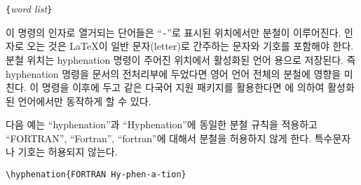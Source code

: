 \begin{lscommand}
\verb|{|\emph{word list}\verb|}|
\end{lscommand}
\noindent 이 명령의 인자로 열거되는 단어들은 ``\verb|-|''로 표시된 위치에서만 분철이 이루어진다.
인자로 오는 것은 \LaTeX 이 일반 문자(letter)로 간주하는 문자와 기호를 포함해야 한다. 
분철 위치는 hyphenation 명령이 주어진 위치에서 활성화된 언어 용으로 저장된다. 
즉 hyphenation 명령을 문서의 전처리부에 두었다면 영어 언어 전체의 분철에 영향을 미친다.
이 명령을 \verb|| 이후에 두고  같은 다국어 지원 패키지를 활용한다면
에 의하여 활성화된 언어에서만 동작하게 할 수 있다.

다음 예는 ``hyphenation''과 ``Hyphenation''에 동일한 분철 규칙을 적용하고 ``FORTRAN'', ``Fortran'', ``fortran''에 
대해서 분철을 허용하지 않게 한다. 특수문자나 기호는 허용되지 않는다.

\begin{code}
\verb|\hyphenation{FORTRAN Hy-phen-a-tion}|
\end{code}


